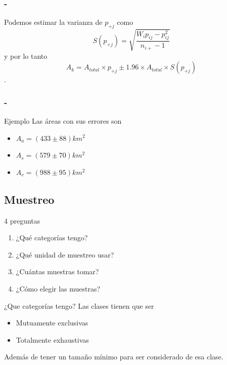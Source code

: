 \documentclass[handout]{beamer}
\begin{document}
\begin{frame}
    \frametitle{\secname-\subsecname}
    Podemos estimar la varianza de $p_{+j}$ como
    \begin{equation}
        S(p_{+j}) = \sqrt{\frac{W_i p_{ij} - p_{ij}^2}{n_{i+}-1}}
    \end{equation}\pause
    y por lo tanto $$A_k = A_{total} \times p_{+j} \pm 1.96 \times
    A_{total}\times S(p_{+j})$$.
\end{frame}

\begin{frame}
    \frametitle{\secname-\subsecname}
 \begin{exampleblock}{Ejemplo}
     Las áreas con sus errores son
     \begin{itemize}
         \item $A_a = (433\pm88)km^2$
         \item $A_s = (579\pm70)km^2$
         \item $A_v = (988\pm95)km^2$
     \end{itemize}
  \end{exampleblock}

\end{frame}

\subsection{Muestreo}

\begin{frame}{\subsecname}
  \begin{block}{4 preguntas}
  \begin{enumerate}
    \item ¿Qué categorías tengo?
    \item ¿Qué unidad de muestreo usar?
    \item ¿Cuántas muestras tomar?
    \item ¿Cómo elegir las muestras?
  \end{enumerate}
  \end{block}
\end{frame}

\begin{frame}{\subsecname}
  \begin{block}{¿Que categorías tengo?}
    Las clases tienen que ser \pause
    \begin{itemize}[<+>]
      \item Mutuamente exclusivas
      \item Totalmente exhaustivas
    \end{itemize}
    Además de tener un tamaño mínimo para ser considerado de esa clase.
  \end{block}
\end{frame}
\end{document}
